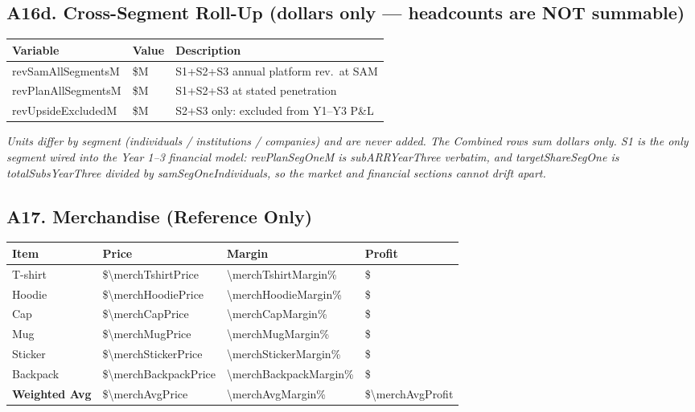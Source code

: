 \medskip
\subsection*{A16d. Cross-Segment Roll-Up (dollars only --- headcounts are NOT summable)}
\begin{tabularx}{\linewidth}{l Y X}
\toprule
\textbf{Variable} & \textbf{Value} & \textbf{Description} \\\midrule
revSamAllSegmentsM & \$\validate{\revSamAllSegmentsM}{\HCrevSamAllSegmentsM}M & S1+S2+S3 annual platform rev.\ at SAM \\
revPlanAllSegmentsM & \$\validate{\revPlanAllSegmentsM}{\HCrevPlanAllSegmentsM}M & S1+S2+S3 at stated penetration \\
revUpsideExcludedM & \$\validate{\revUpsideExcludedM}{\HCrevUpsideExcludedM}M & S2+S3 only: excluded from Y1--Y3 P\&L \\
\bottomrule
\end{tabularx}

\medskip
\noindent\textit{Units differ by segment (individuals / institutions / companies) and
are never added. The Combined rows sum dollars only. S1 is the only segment wired into
the Year 1--3 financial model: revPlanSegOneM is subARRYearThree verbatim, and
targetShareSegOne is totalSubsYearThree divided by samSegOneIndividuals, so the market
and financial sections cannot drift apart.}

\subsection*{A17. Merchandise (Reference Only)}
\begin{tabularx}{\linewidth}{l Y Y Y}
\toprule
\textbf{Item} & \textbf{Price} & \textbf{Margin} & \textbf{Profit} \\\midrule
T-shirt & \$\num{\merchTshirtPrice} & \num{\merchTshirtMargin}\% & \$ \\
Hoodie & \$\num{\merchHoodiePrice} & \num{\merchHoodieMargin}\% & \$ \\
Cap & \$\num{\merchCapPrice} & \num{\merchCapMargin}\% & \$ \\
Mug & \$\num{\merchMugPrice} & \num{\merchMugMargin}\% & \$ \\
Sticker & \$\num{\merchStickerPrice} & \num{\merchStickerMargin}\% & \$ \\
Backpack & \$\num{\merchBackpackPrice} & \num{\merchBackpackMargin}\% & \$ \\\midrule
\textbf{Weighted Avg} & \$\num{\merchAvgPrice} & \num{\merchAvgMargin}\% & \$\num{\merchAvgProfit} \\
\bottomrule
\end{tabularx}

